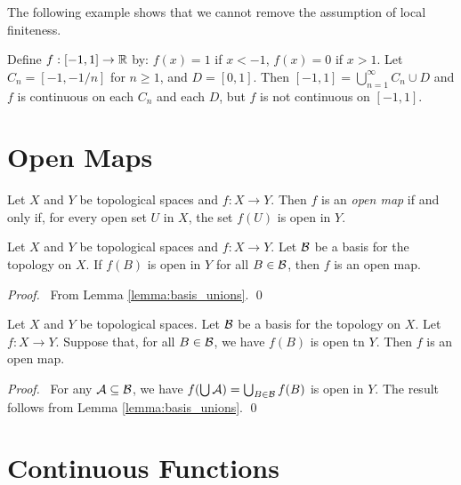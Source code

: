 The following example shows that we cannot remove the assumption of local finiteness.

\begin{example}
    Define $f : [-1,1] \rightarrow \mathbb{R}$ by: $f(x) = 1$ if $x < -1$, $f(x) = 0$ if $x > 1$. Let $C_n = [-1,-1/n]$ for $n \geq 1$, and $D = [0,1]$. Then
    $[-1,1] = \bigcup_{n=1}^\infty C_n \cup D$ and $f$ is continuous on each $C_n$ and each $D$, but $f$ is not continuous on $[-1,1]$.    
\end{example}

\section{Open Maps}

\begin{definition}
    Let $X$ and $Y$ be topological spaces and $f : X \rightarrow Y$. Then $f$ is an \emph{open map} if and
    only if, for every open set $U$ in $X$, the set $f(U)$ is open in $Y$.
\end{definition}

\begin{lemma}
    \label{lemma:open_map_basis}
    Let $X$ and $Y$ be topological spaces and $f : X \rightarrow Y$. Let $\mathcal{B}$ be a basis for the topology on $X$.
    If $f(B)$ is open in $Y$ for all $B \in \mathcal{B}$, then $f$ is an open map.
\end{lemma}

\begin{proof}
    \pf\ From Lemma \ref{lemma:basis_unions}. \qed
\end{proof}

\begin{proposition}
    \label{proposition:open_map_basis}
    Let $X$ and $Y$ be topological spaces. Let $\mathcal{B}$ be a basis for the topology on $X$.
    Let $f : X \rightarrow Y$. Suppose that, for all $B \in \mathcal{B}$, we have $f(B)$
    is open tn $Y$. Then $f$ is an open map.
\end{proposition}

\begin{proof}
    \pf\ For any $\mathcal{A} \subseteq \mathcal{B}$, we have $f(\bigcup \mathcal{A}) = \bigcup_{B \in \mathcal{B}} f(B)$
    is open in $Y$. The result follows from Lemma \ref{lemma:basis_unions}. \qed
\end{proof}

\section{Continuous Functions}

